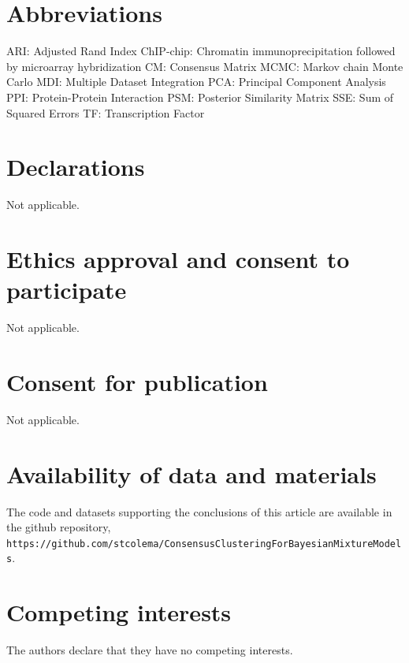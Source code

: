 \documentclass{bmcart}
\begin{document}
	\begin{backmatter}
		
		\section*{Abbreviations}%
		ARI: Adjusted Rand Index \newline 
		ChIP-chip: Chromatin immunoprecipitation followed by microarray hybridization \newline
		CM: Consensus Matrix \newline
		MCMC: Markov chain Monte Carlo \newline
		MDI: Multiple Dataset Integration \newline
		PCA: Principal Component Analysis \newline
		PPI: Protein-Protein Interaction \newline
		PSM: Posterior Similarity Matrix \newline
		SSE: Sum of Squared Errors \newline
		TF: Transcription Factor
		
		\section*{Declarations}
		Not applicable.
		
		\section*{Ethics approval and consent to participate}%
		Not applicable.
		
		\section*{Consent for publication}
		Not applicable.
		
		\section*{Availability of data and materials}%
		The code and datasets supporting the conclusions of this article are available in the github repository, \texttt{https://github.com/stcolema/ConsensusClusteringForBayesianMixtureModels}.
		
		\section*{Competing interests}
		The authors declare that they have no competing interests.
		

\end{backmatter}
\end{document}
